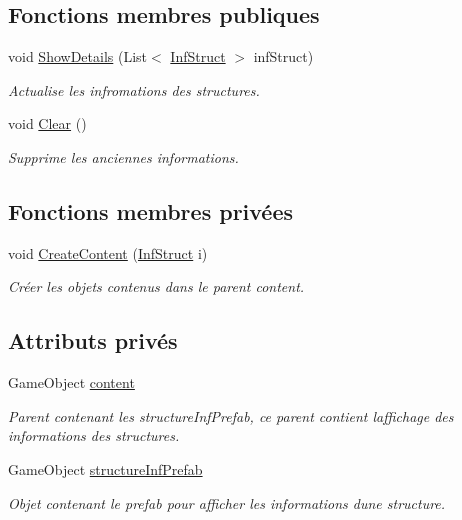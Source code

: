 \subsection*{Fonctions membres publiques}
\begin{DoxyCompactItemize}
\item 
void \mbox{\hyperlink{class_details_structure_a43f45ec1bc3888d7db09407d52964352}{Show\+Details}} (List$<$ \mbox{\hyperlink{class_inf_struct}{Inf\+Struct}} $>$ inf\+Struct)
\begin{DoxyCompactList}\small\item\em Actualise les infromations des structures. \end{DoxyCompactList}\item 
void \mbox{\hyperlink{class_details_structure_a4653aac26e25e56d4dd6b5f45ad9f4ef}{Clear}} ()
\begin{DoxyCompactList}\small\item\em Supprime les anciennes informations. \end{DoxyCompactList}\end{DoxyCompactItemize}
\subsection*{Fonctions membres privées}
\begin{DoxyCompactItemize}
\item 
void \mbox{\hyperlink{class_details_structure_a58ff01a7fcdfc6b081aebb4ae42d26f0}{Create\+Content}} (\mbox{\hyperlink{class_inf_struct}{Inf\+Struct}} i)
\begin{DoxyCompactList}\small\item\em Créer les objets contenus dans le parent content. \end{DoxyCompactList}\end{DoxyCompactItemize}
\subsection*{Attributs privés}
\begin{DoxyCompactItemize}
\item 
Game\+Object \mbox{\hyperlink{class_details_structure_a404d66a2438aa2f6e020461d9e6a442a}{content}}
\begin{DoxyCompactList}\small\item\em Parent contenant les structure\+Inf\+Prefab, ce parent contient l\textquotesingle{}affichage des informations des structures. \end{DoxyCompactList}\item 
Game\+Object \mbox{\hyperlink{class_details_structure_a82f791c8215e3b995b78a35e5156814b}{structure\+Inf\+Prefab}}
\begin{DoxyCompactList}\small\item\em Objet contenant le prefab pour afficher les informations d\textquotesingle{}une structure. \end{DoxyCompactList}\end{DoxyCompactItemize}


